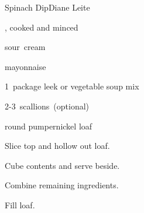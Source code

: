 \begin{recipe}{Spinach Dip}{Diane Leite}{}

\begin{ingredients}
\item {} , cooked and minced
\item {} sour~cream
\item {} mayonnaise
\item 1~package leek or vegetable soup mix
\item 2-3~scallions~(optional)
\item round pumpernickel loaf
\end{ingredients}

\begin{directions}
\item Slice top and hollow out loaf.
\item Cube contents and serve beside.
\item Combine remaining ingredients.
\item Fill loaf.
\end{directions}

\end{recipe}
